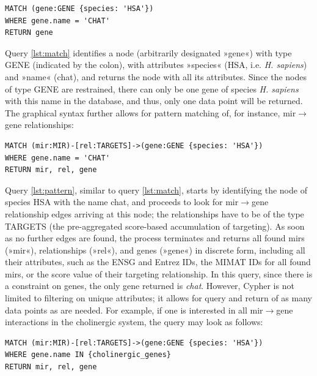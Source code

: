 \begin{lstlisting}[label=lst:match, caption=MATCH, language=Cypher]
MATCH (gene:GENE {species: 'HSA'})
WHERE gene.name = 'CHAT'
RETURN gene
\end{lstlisting}

Query \ref{lst:match} identifies a node (arbitrarily designated »gene«) with type GENE (indicated by the colon), with attributes »species« (HSA, i.e. \textit{H. sapiens}) and »name« (\ac{chat}), and returns the node with all its attributes. Since the nodes of type GENE are restrained, there can only be one gene of species \textit{H. sapiens} with this name in the database, and thus, only one data point will be returned. The graphical syntax further allows for pattern matching of, for instance, \ac{mir}$\to$gene relationships:

\begin{lstlisting}[label=lst:pattern, caption=Patterns,
language=Cypher]
MATCH (mir:MIR)-[rel:TARGETS]->(gene:GENE {species: 'HSA'})
WHERE gene.name = 'CHAT'
RETURN mir, rel, gene
\end{lstlisting}

Query \ref{lst:pattern}, similar to query \ref{lst:match}, starts by identifying the node of species HSA with the name \ac{chat}, and proceeds to look for \ac{mir}$\to$gene relationship edges arriving at this node; the relationships have to be of the type TARGETS (the pre-aggregated score-based accumulation of targeting). As soon as no further edges are found, the process terminates and returns all found \acp{mir} (»mir«), relationships (»rel«), and genes (»gene«) in discrete form, including all their attributes, such as the ENSG and Entrez IDs, the MIMAT IDs for all found \acp{mir}, or the score value of their targeting relationship. In this query, since there is a constraint on genes, the only gene returned is \textit{\ac{chat}}. However, Cypher is not limited to filtering on unique attributes; it allows for query and return of as many data points as are needed. For example, if one is interested in all \ac{mir}$\to$gene interactions in the cholinergic system, the query may look as follows:

\begin{lstlisting}[label=lst:filter, caption=Filtering,
language=Cypher]
MATCH (mir:MIR)-[rel:TARGETS]->(gene:GENE {species: 'HSA'})
WHERE gene.name IN {cholinergic_genes}
RETURN mir, rel, gene
\end{lstlisting}


